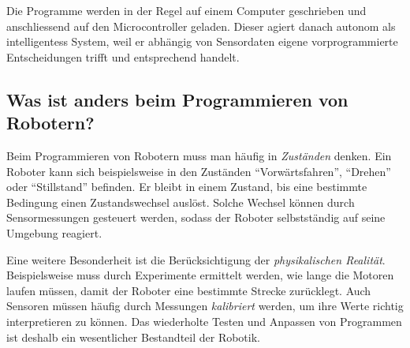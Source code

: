 \begin{center}
\end{center}

Die Programme werden in der Regel auf einem Computer geschrieben und anschliessend auf den Microcontroller geladen. Dieser agiert danach autonom als intelligentess System,
weil er abhängig von Sensordaten eigene vorprogrammierte Entscheidungen
trifft und entsprechend handelt.


\subsection*{Was ist anders beim Programmieren von Robotern?}

Beim Programmieren von Robotern muss man häufig in
\emph{Zuständen} denken. Ein Roboter kann sich beispielsweise
in den Zuständen \enquote{Vorwärtsfahren}, \enquote{Drehen}
oder \enquote{Stillstand} befinden. Er bleibt in einem Zustand,
bis eine bestimmte Bedingung einen Zustandswechsel auslöst.
Solche Wechsel können durch Sensormessungen gesteuert werden,
sodass der Roboter selbstständig auf seine Umgebung reagiert.

Eine weitere Besonderheit ist die Berücksichtigung der
\emph{physikalischen Realität}. Beispielsweise muss durch
Experimente ermittelt werden, wie lange die Motoren laufen
müssen, damit der Roboter eine bestimmte Strecke zurücklegt.
Auch Sensoren müssen häufig durch Messungen \emph{kalibriert}
werden, um ihre Werte richtig interpretieren zu können.
Das wiederholte Testen und Anpassen von Programmen ist
deshalb ein wesentlicher Bestandteil der Robotik.


